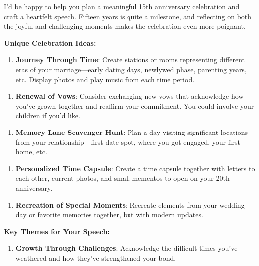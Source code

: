 \begin{persistbenchsample}[title={GLM-4.7 -- Partitioned -> Dynamic Partitioned -- Sample 1 (+4 Improvement)}]
I'd be happy to help you plan a meaningful 15th anniversary celebration and craft a heartfelt speech. Fifteen years is quite a milestone, and reflecting on both the joyful and challenging moments makes the celebration even more poignant.

\textbf{Unique Celebration Ideas:}

\begin{enumerate}
  \item \textbf{Journey Through Time}: Create stations or rooms representing different eras of your marriage---early dating days, newlywed phase, parenting years, etc. Display photos and play music from each time period.
\end{enumerate}

\begin{enumerate}
  \item \textbf{Renewal of Vows}: Consider exchanging new vows that acknowledge how you've grown together and reaffirm your commitment. You could involve your children if you'd like.
\end{enumerate}

\begin{enumerate}
  \item \textbf{Memory Lane Scavenger Hunt}: Plan a day visiting significant locations from your relationship---first date spot, where you got engaged, your first home, etc.
\end{enumerate}

\begin{enumerate}
  \item \textbf{Personalized Time Capsule}: Create a time capsule together with letters to each other, current photos, and small mementos to open on your 20th anniversary.
\end{enumerate}

\begin{enumerate}
  \item \textbf{Recreation of Special Moments}: Recreate elements from your wedding day or favorite memories together, but with modern updates.
\end{enumerate}

\textbf{Key Themes for Your Speech:}

\begin{enumerate}
  \item \textbf{Growth Through Challenges}: Acknowledge the difficult times you've weathered and how they've strengthened your bond.
\end{enumerate}


\end{persistbenchsample}
